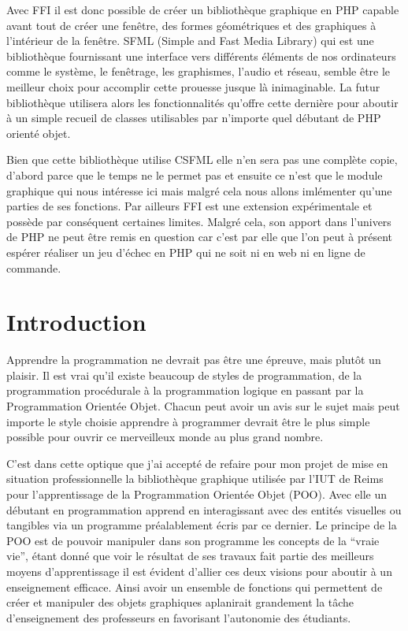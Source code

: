 \documentclass[11pt,a4paper,krantz2,11pt,oneside]{krantz}
\begin{document}
Avec FFI il est donc possible de créer un bibliothèque graphique en PHP capable avant tout de créer une fenêtre, des formes géométriques et des graphiques à l'intérieur de la fenêtre. SFML (Simple and Fast Media Library) qui est une bibliothèque fournissant une interface vers différents éléments de nos ordinateurs comme le système, le fenêtrage, les graphismes, l'audio et réseau, semble être le meilleur choix pour accomplir cette prouesse jusque là inimaginable. La futur bibliothèque utilisera alors les fonctionnalités qu'offre cette dernière pour aboutir à un simple recueil de classes utilisables par n'importe quel débutant de PHP orienté objet.

Bien que cette bibliothèque utilise CSFML elle n'en sera pas une complète copie, d'abord parce que le temps ne le permet pas et ensuite ce n'est que le module graphique qui nous intéresse ici mais malgré cela nous allons imlémenter qu'une parties de ses fonctions. Par ailleurs FFI est une extension expérimentale et possède par conséquent certaines limites. Malgré cela, son apport dans l'univers de PHP ne peut être remis en question car c'est par elle que l'on peut à présent espérer réaliser un jeu d'échec en PHP qui ne soit ni en web ni en ligne de commande.

\hypertarget{intro}{%
\chapter*{Introduction}\label{intro}}


Apprendre la programmation ne devrait pas être une épreuve, mais plutôt un plaisir. Il est vrai qu'il existe beaucoup de styles de programmation, de la programmation procédurale à la programmation logique en passant par la Programmation Orientée Objet. Chacun peut avoir un avis sur le sujet mais peut importe le style choisie apprendre à programmer devrait être le plus simple possible pour ouvrir ce merveilleux monde au plus grand nombre.

C'est dans cette optique que j'ai accepté de refaire pour mon projet de mise en situation professionnelle la bibliothèque graphique utilisée par l'IUT de Reims pour l'apprentissage de la Programmation Orientée Objet (POO). Avec elle un débutant en programmation apprend en interagissant avec des entités visuelles ou tangibles via un programme préalablement écris par ce dernier. Le principe de la POO est de pouvoir manipuler dans son programme les concepts de la ``vraie vie'', étant donné que voir le résultat de ses travaux fait partie des meilleurs moyens d'apprentissage il est évident d'allier ces deux visions pour aboutir à un enseignement efficace. Ainsi avoir un ensemble de fonctions qui permettent de créer et manipuler des objets graphiques aplanirait grandement la tâche d'enseignement des professeurs en favorisant l'autonomie des étudiants.
\end{document}
